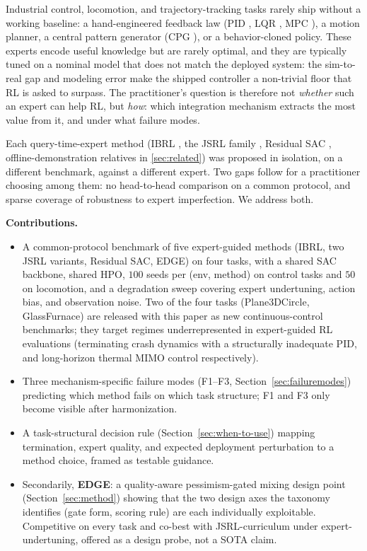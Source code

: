 \documentclass{article}
\begin{document}
Industrial control, locomotion, and trajectory-tracking tasks
rarely ship without a working baseline: a hand-engineered feedback
law (PID \citep{astrom2005amigo}, LQR \citep{kalman1960lqr},
MPC \citep{rawlings2017mpc}), a motion planner, a central pattern
generator (CPG \citep{ijspeert2008cpg}), or a behavior-cloned
policy. These experts encode useful knowledge but are rarely
optimal, and they are typically tuned on a nominal model that does
not match the deployed system: the sim-to-real gap and modeling
error make the shipped controller a non-trivial floor that RL is
asked to surpass. The practitioner's question is therefore not
\emph{whether} such an expert can help RL, but \emph{how}: which
integration mechanism extracts the most value from it, and under
what failure modes.

Each query-time-expert method (IBRL \citep{hu2023ibrl}, the JSRL
family \citep{uchendu2023jsrl}, Residual SAC
\citep{johannink2019residual}, offline-demonstration relatives in
\cref{sec:related}) was proposed in isolation, on a different
benchmark, against a different expert. Two gaps follow for a
practitioner choosing among them: no head-to-head comparison on a
common protocol, and sparse coverage of robustness to expert
imperfection. We address both.

\newpage

\textbf{Contributions.}
\begin{itemize}[leftmargin=1.2em,itemsep=2pt,topsep=2pt]
\item A common-protocol benchmark of five expert-guided methods
(IBRL, two JSRL variants, Residual SAC, EDGE) on four tasks, with a
shared SAC backbone, shared HPO, $100$ seeds per (env, method) on
control tasks and $50$ on locomotion, and a degradation sweep
covering expert undertuning, action bias, and observation noise.
Two of the four tasks (Plane3DCircle, GlassFurnace) are released
with this paper as new continuous-control benchmarks; they target
regimes underrepresented in expert-guided RL evaluations
(terminating crash dynamics with a structurally inadequate PID,
and long-horizon thermal MIMO control respectively).
\item Three mechanism-specific failure modes (F1--F3,
Section~\ref{sec:failuremodes}) predicting which method fails on
which task structure; F1 and F3 only become visible after
harmonization.
\item A task-structural decision rule
(Section~\ref{sec:when-to-use}) mapping termination, expert quality,
and expected deployment perturbation to a method choice, framed as
testable guidance.
\item Secondarily, \textbf{EDGE}: a quality-aware pessimism-gated
mixing design point (Section~\ref{sec:method}) showing that the
two design axes the taxonomy identifies (gate form, scoring rule) are
each individually exploitable. Competitive on every task and
co-best with JSRL-curriculum under expert-undertuning, offered as a design
probe, not a SOTA claim.
\end{itemize}
\end{document}
